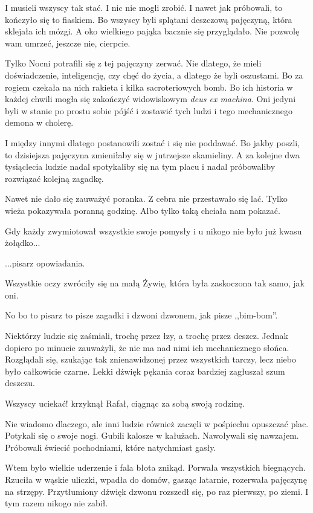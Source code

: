 I musieli wszyscy tak stać.
I nic nie mogli zrobić.
I nawet jak próbowali, to kończyło się to fiaskiem.
Bo wszyscy byli splątani deszczową pajęczyną, która sklejała ich mózgi.
A oko wielkiego pająka bacznie się przyglądało.
Nie pozwolę wam umrzeć, jeszcze nie, cierpcie.

Tylko Nocni potrafili się z tej pajęczyny zerwać.
Nie dlatego, że mieli doświadczenie, inteligencję, czy chęć do życia, a dlatego że byli oszustami.
Bo za rogiem czekała na nich rakieta i kilka sacroteriowych bomb.
Bo ich historia w każdej chwili mogła się zakończyć widowiskowym \emph{deus ex machina}.
Oni jedyni byli w stanie po prostu sobie pójść i zostawić tych ludzi i tego mechanicznego demona w cholerę.

I między innymi dlatego postanowili zostać i się nie poddawać.
Bo jakby poszli, to dzisiejsza pajęczyna zmieniłaby się w jutrzejsze skamieliny.
A za kolejne dwa tysiąclecia ludzie nadal spotykaliby się na tym placu i nadal próbowaliby rozwiązać kolejną zagadkę.

Nawet nie dało się zauważyć poranka.
Z cebra nie przestawało się lać.
Tylko wieża pokazywała poranną godzinę. Albo tylko taką chciała nam pokazać.

Gdy każdy zwymiotował wszystkie swoje pomysły i u nikogo nie było już kwasu żołądko...
\begin{dialogue}
	\ds{} ...pisarz opowiadania.
\end{dialogue}
Wszystkie oczy zwróciły się na małą Żywię, która była zaskoczona tak samo, jak oni.
\begin{dialogue}
	\ds{} No bo to pisarz to pisze zagadki i dzwoni dzwonem, jak pisze ,,bim-bom''.
\end{dialogue}
Niektórzy ludzie się zaśmiali, trochę przez łzy, a trochę przez deszcz.
Jednak dopiero po minucie zauważyli, że nie ma nad nimi ich mechanicznego słońca.
Rozglądali się, szukając tak znienawidzonej przez wszystkich tarczy, lecz niebo było całkowicie czarne.
Lekki dźwięk pękania coraz bardziej zagłuszał szum deszczu.
\begin{dialogue}
	\ds{} Wszyscy uciekać! \dm{} krzyknął Rafał, ciągnąc za sobą swoją rodzinę.
\end{dialogue}
Nie wiadomo dlaczego, ale inni ludzie również zaczęli w pośpiechu opuszczać plac.
Potykali się o swoje nogi.
Gubili kalosze w kałużach.
Nawoływali się nawzajem.
Próbowali świecić pochodniami, które natychmiast gasły.

Wtem było wielkie uderzenie i fala błota znikąd.  
Porwała wszystkich biegnących.
Rzuciła w wąskie uliczki, wpadła do domów, gasząc latarnie, rozerwała pajęczynę na strzępy.
Przytłumiony dźwięk dzwonu rozszedł się, po raz pierwszy, po ziemi.
I tym razem nikogo nie zabił.


















